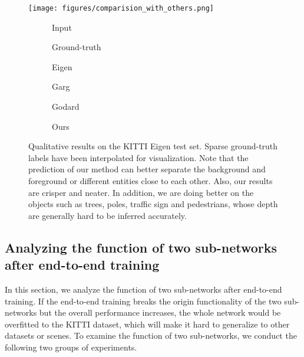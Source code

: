 \documentclass[10pt,twocolumn,letterpaper]{article}
\begin{document}
\begin{figure*}[t!]
\centering
	\texttt{[image: figures/comparision\_with\_others.png]}
	\begin{subfigure}[b]{0.16\linewidth}
    \caption{Input}
  	\end{subfigure}
  	\begin{subfigure}[b]{0.16\linewidth}
    \caption{Ground-truth}
  	\end{subfigure}
	\begin{subfigure}[b]{0.16\linewidth}
    \caption{Eigen \etal~\cite{eigen2014depth}}
  	\end{subfigure}
  	\begin{subfigure}[b]{0.16\linewidth}
    \caption{Garg \etal~\cite{garg2016unsupervised}}
  	\end{subfigure}
  	\begin{subfigure}[b]{0.16\linewidth}
    \caption{Godard \etal~\cite{godard2016unsupervised}}
  	\end{subfigure}
  	\begin{subfigure}[b]{0.16\linewidth}
    \caption{Ours}
  	\end{subfigure}
  	\vspace{-12pt}
	\caption{Qualitative results on the KITTI Eigen test set. Sparse ground-truth labels have been interpolated for visualization.
Note that the prediction of our method can better separate the background and foreground or different entities close to each other. Also, our results are crisper and neater. In addition, we are doing better on the objects such as trees, poles, traffic sign and pedestrians, whose depth are generally hard to be inferred accurately.}
	\label{fig:qualitative-reults}
	\vspace{-10pt}
\end{figure*}

\subsection{Analyzing the function of two sub-networks after end-to-end training}
In this section, we analyze the function of two sub-networks after end-to-end training. If the end-to-end training breaks the origin functionality of the two sub-networks but the overall performance increases, the whole network would be overfitted to the KITTI dataset, which will make it hard to generalize to other datasets or scenes. To examine the function of two sub-networks, we conduct the following two groups of experiments.
\end{document}

